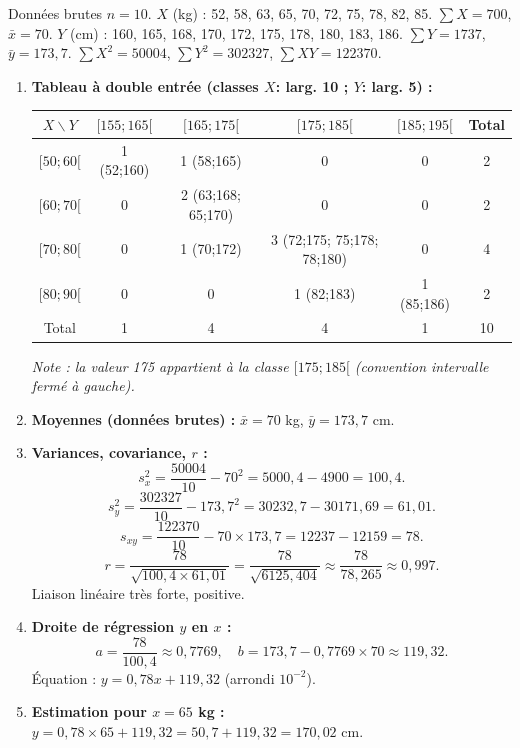 \documentclass[11pt]{article}
\begin{document}
\begin{corrige}
Données brutes $n=10$.
$X$ (kg) : 52, 58, 63, 65, 70, 72, 75, 78, 82, 85. $\sum X = 700$, $\bar{x}=70$.
$Y$ (cm) : 160, 165, 168, 170, 172, 175, 178, 180, 183, 186. $\sum Y = 1737$, $\bar{y}=173,7$.
$\sum X^2 = 50004$, $\sum Y^2 = 302327$, $\sum XY = 122370$.

\begin{enumerate}
\item \textbf{Tableau à double entrée (classes $X$: larg. 10 ; $Y$: larg. 5) :}
\begin{center}
\begin{tabular}{|c|cccc|c|}\hline
$X \backslash Y$ & $[155;165[$ & $[165;175[$ & $[175;185[$ & $[185;195[$ & Total \\ \hline
$[50;60[$ & 1 (52;160) & 1 (58;165) & 0 & 0 & 2 \\
$[60;70[$ & 0 & 2 (63;168; 65;170) & 0 & 0 & 2 \\
$[70;80[$ & 0 & 1 (70;172) & 3 (72;175; 75;178; 78;180) & 0 & 4 \\
$[80;90[$ & 0 & 0 & 1 (82;183) & 1 (85;186) & 2 \\ \hline
Total & 1 & 4 & 4 & 1 & 10 \\ \hline
\end{tabular}
\end{center}
\emph{Note : la valeur 175 appartient à la classe $[175;185[$ (convention intervalle fermé à gauche).}

\item \textbf{Moyennes (données brutes) :} $\bar{x} = 70$ kg, $\bar{y} = 173,7$ cm.

\item \textbf{Variances, covariance, $r$ :}
\[
s_x^2 = \frac{50004}{10} - 70^2 = 5000,4 - 4900 = 100,4.
\]
\[
s_y^2 = \frac{302327}{10} - 173,7^2 = 30232,7 - 30171,69 = 61,01.
\]
\[
s_{xy} = \frac{122370}{10} - 70 \times 173,7 = 12237 - 12159 = 78.
\]
\[
r = \frac{78}{\sqrt{100,4 \times 61,01}} = \frac{78}{\sqrt{6125,404}} \approx \frac{78}{78,265} \approx \boxed{0,997}.
\]
Liaison linéaire très forte, positive.

\item \textbf{Droite de régression $y$ en $x$ :}
\[
a = \frac{78}{100,4} \approx 0,7769, \quad b = 173,7 - 0,7769 \times 70 \approx 119,32.
\]
Équation : $\boxed{y = 0,78x + 119,32}$ (arrondi $10^{-2}$).

\item \textbf{Estimation pour $x=65$ kg :} $y = 0,78 \times 65 + 119,32 = 50,7 + 119,32 = \boxed{170,02 \text{ cm}}$.


\end{enumerate}
\end{corrige}
\end{document}

